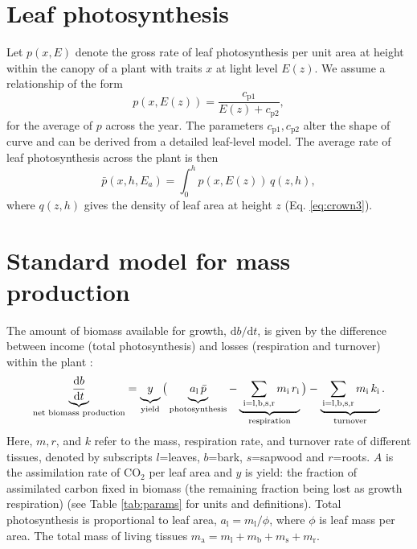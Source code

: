 \documentclass[10pt,twoside]{article}
\begin{document}
\section{Leaf photosynthesis}\label{leaf-photosynthesis}

Let \(p(x,E)\) denote the gross rate of leaf photosynthesis per unit
area at height within the canopy of a plant with traits \(x\) at light
level \(E(z)\). We assume a relationship of the form
\begin{equation}\label{eq:photosynthesis}
p(x,E(z))=\frac{c_\textrm{p1}}{E(z)+c_\textrm{p2}},
\end{equation}
for the average of \(p\) across the year. The parameters
\(c_\textrm{p1}, c_\textrm{p2}\) alter the shape of curve and can be
derived from a detailed leaf-level model.
The average rate of leaf photosynthesis across the plant is then
\begin{equation}\label{eq:photosynthesis_av}
\bar{p}(x,h,E_a)=\int_0^h p(x,E(z)) \, q(z, h),
\end{equation}
where \(q(z, h)\) gives the density of leaf area at height \(z\) (Eq.
\ref{eq:crown3}).

\section{Standard model for mass
production}\label{standard-model-for-mass-production}

The amount of biomass available for growth,
\(\textrm{d}b / \textrm{d}t\), is given by the difference between income
(total photosynthesis) and losses (respiration and turnover) within the
plant \citep{Makela-1997, Thornley-2000, Falster-2011}:
\begin{equation}\label{eq:dbdt}
\underbrace{\strut \frac{\textrm{d}b}{\textrm{d}t}}_\textrm{net biomass production}
  = \underbrace{\strut y}_\textrm{yield}
    \big( \underbrace{\strut a_\textrm{l} \, \bar{p}}_\textrm{photosynthesis} -
     \underbrace{\strut \,\sum_\textrm{i=l,b,s,r}{m_\textrm{i} \, r_\textrm{i}}}_\textrm{respiration}\big)
    - \underbrace{\strut \sum_\textrm{i=l,b,s,r}{m_\textrm{i} \, k_\textrm{i}}}_\textrm{turnover}.
\end{equation}
Here, \(m,r\), and \(k\) refer to the mass, respiration rate, and
turnover rate of different tissues, denoted by subscripts \(l\)=leaves,
\(b\)=bark, \(s\)=sapwood and \(r\)=roots. \(A\) is the assimilation
rate of CO\(_2\) per leaf area and \(y\) is yield: the fraction of
assimilated carbon fixed in biomass (the remaining fraction being lost
as growth respiration) (see Table \ref{tab:params} for units and
definitions). Total photosynthesis is proportional to leaf area,
\(a_\textrm{l} = m_\textrm{l} / \phi\), where \(\phi\) is leaf mass per
area. The total mass of living tissues
\(m_\textrm{a}=m_\textrm{l}+m_\textrm{b}+m_\textrm{s}+m_\textrm{r}.\)
\end{document}
